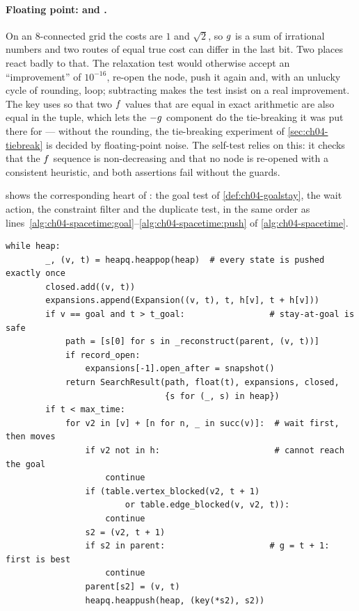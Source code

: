 \paragraph{Floating point:  and .}
On an 8-connected grid the costs are $1$ and $\sqrt{2}$, so $g$ is a sum of
irrational numbers and two routes of equal true cost can differ in the last bit.
Two places react badly to that. The relaxation test
 would otherwise accept an ``improvement'' of
$10^{-16}$, re-open the node, push it again and, with an unlucky cycle of
rounding, loop; subtracting  makes the test insist on a real
improvement. The key uses  so that two $f$ values that
are equal in exact arithmetic are also equal in the tuple, which lets the
$-g$ component do the tie-breaking it was put there for --- without the
rounding, the tie-breaking experiment of \cref{sec:ch04-tiebreak} is decided by
floating-point noise. The self-test relies on this: it checks that the $f$
sequence is non-decreasing and that no node is re-opened with a consistent
heuristic, and both assertions fail without the guards.

 shows the corresponding heart of
: the goal test of \cref{def:ch04-goalstay}, the wait
action, the constraint filter and the duplicate test, in the same order as
lines~\ref{alg:ch04-spacetime:goal}--\ref{alg:ch04-spacetime:push} of
\cref{alg:ch04-spacetime}.

\begin{lstlisting}[caption={The expansion step of space-time \astar (from \code{code/ch04\_astar.py}): the goal-stay test, the wait action, the constraint filter and duplicate detection. \code{h} is the static distance table and \code{table} the reservation table. The \code{closed} set is recorded only for the traces and the figures; correctness needs only \code{parent}.},label={lst:ch04-spacetime}]
    while heap:
        _, (v, t) = heapq.heappop(heap)  # every state is pushed exactly once
        closed.add((v, t))
        expansions.append(Expansion((v, t), t, h[v], t + h[v]))
        if v == goal and t > t_goal:                 # stay-at-goal is safe
            path = [s[0] for s in _reconstruct(parent, (v, t))]
            if record_open:
                expansions[-1].open_after = snapshot()
            return SearchResult(path, float(t), expansions, closed,
                                {s for (_, s) in heap})
        if t < max_time:
            for v2 in [v] + [n for n, _ in succ(v)]:  # wait first, then moves
                if v2 not in h:                       # cannot reach the goal
                    continue
                if (table.vertex_blocked(v2, t + 1)
                        or table.edge_blocked(v, v2, t)):
                    continue
                s2 = (v2, t + 1)
                if s2 in parent:                     # g = t + 1: first is best
                    continue
                parent[s2] = (v, t)
                heapq.heappush(heap, (key(*s2), s2))
\end{lstlisting}

